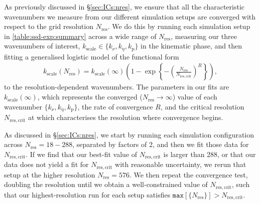 \documentclass[12pt,twoside]{extreport}
\newcommand{\rbrac}[1]{\left( #1 \right)} %
\newcommand{\cbrac}[1]{\left\{ #1 \right\}} %
\providecommand{\DIFdelend}{} %
\DeclareRobustCommand{\DIFdelend}{\DIFOaddend \let\includegraphics\DIFOincludegraphics} %
\begin{document}
\DIFdelend As previously discussed in \S\ref{sec:ICs:nres}, we ensure that all the characteristic wavenumbers we measure from our different simulation setups are converged with respect to the grid resolution $N_\mathrm{res}$. We do this by running each simulation setup in \autoref{table:ssd-exp:summary} across a wide range of $N_\mathrm{res}$, measuring our three wavenumbers of interest, $k_\mathrm{scale} \in \{k_\nu, k_\eta, k_\mathrm{p}\}$ in the kinematic phase, and then fitting a generalised logistic model of the functional form
\begin{align}
    k_\mathrm{scale}(N_\mathrm{res})
        = k_\mathrm{scale}(\infty) \rbrac{
                1 - \exp\cbrac{ -\rbrac{\frac{N_\mathrm{res}}{N_\mathrm{res, crit}}}^R }
            }
        , \label{eqn:nres}
\end{align}
to the resolution-dependent wavenumbers. The parameters in our fits are $k_\mathrm{scale}(\infty)$, which represents the converged ($N_\mathrm{res} \to \infty$) value of each wavenumber $\{k_\nu, k_\eta, k_\mathrm{p}\}$, the rate of convergence $R$, and the critical resolution $N_\mathrm{res, crit}$ at which characterises the resolution where convergence begins.

As discussed in \S\ref{sec:ICs:nres}, we start by running each simulation configuration across $N_\mathrm{res} = 18 - 288$, separated by factors of 2, and then we fit those data for $N_\mathrm{res,crit}$. If we find that our best-fit value of $N_\mathrm{res,crit}$ is larger than 288, or that our data does not yield a fit for $N_\mathrm{res,crit}$ with reasonable uncertainty, we rerun that setup at the higher resolution $N_\mathrm{res} = 576$. We then repeat the convergence test, doubling the resolution until we obtain a well-constrained value of $N_\mathrm{res,crit}$, such that our highest-resolution run for each setup satisfies $\texttt{max}[\{N_\mathrm{res}\}] > N_\mathrm{res, crit}$.
\end{document}
